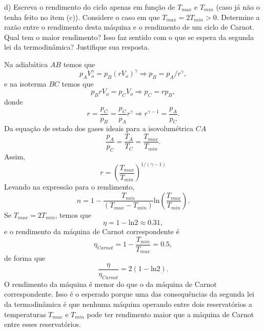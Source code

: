 \begin{enumerate}[start=1,label={\bfseries Q\arabic*.}]
 d) Escreva o rendimento do ciclo apenas em função de $T_{max}$ e $T_{min}$ (caso já não o tenha feito no item (c)). Considere o caso em que $T_{max} = 2T_{min} > 0$. Determine a razão entre o rendimento desta máquina e o rendimento de um ciclo de Carnot. Qual tem o maior rendimento? Isso faz sentido com o que se espera da segunda lei da termodinâmica? Justifique sua resposta.

\resposta Na adiabática $AB$ temos que
%
\begin{equation}
  p_{A} V_{o}^{\gamma} = p_{B} (r V_{o})^{\gamma} \Rightarrow p_{B} = p_{A} / r^{\gamma} ,
\end{equation}
%
e na isoterma $BC$ temos que
%
\begin{equation}
  p_{B} r V_{o} = p_{C} V_{o} \Rightarrow p_{C} = r p_{B} ,
\end{equation}
%
donde
%
\begin{equation}
  r = \frac{p_{C}}{p_{B}} = \frac{p_{C}}{p_{A}} r^{\gamma} \Rightarrow r^{\gamma - 1} = \frac{p_{A}}{p_{C}} .
\end{equation}
%
Da equação de estado dos gases ideais para a isovolumétrica $CA$
%
\begin{equation}
  \frac{p_{A}}{p_{C}} = \frac{T_{A}}{T_{C}} = \frac{T_{max}}{T_{min}} .
\end{equation}
%
Assim,
%
\begin{equation}
  r = \left( \frac{T_{max}}{T_{min}}   \right)^{1/(\gamma - 1)}
\end{equation}
%
Levando na expressão para o rendimento,
%
\begin{equation}
  n = 1 - \frac{T_{min}}{(T_{max} - T_{min})} \mbox{ln} \left( \frac{T_{max}}{T_{min}} \right) .
\end{equation}
%
Se $T_{max} = 2T_{min}$, temos que
%
\begin{equation}
  \eta = 1 - \mbox{ln} 2 \approx 0.31 ,
\end{equation}
%
e o rendimento da máquina de Carnot correspondente é
%
\begin{equation}
  \eta_{Carnot} = 1 - \frac{T_{min}}{T_{max}} = 0.5 ,
\end{equation}
%
de forma que
%
\begin{equation}
  \frac{\eta}{\eta_{Carnot}} = 2 (1 - \mbox{ln}2 ) .
\end{equation}
%
O rendimento da máquina é menor do que o da máquina de Carnot correspondente. Isso é o esperado porque uma das consequências da segunda lei da termodinâmica é que nenhuma máquina operando entre dois reservatórios a temperaturas $T_{max}$ e $T_{min}$ pode ter rendimento maior que a máquina de Carnot entre esses reservatórios.










\end{enumerate}
